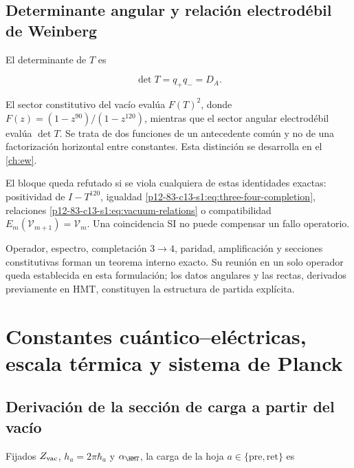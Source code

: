 \subsection{Determinante angular y relaci\'on electrod\'ebil de Weinberg}

El determinante de \(T\) es

\begin{equation}
\det T=q_+q_-=D_A.
\label{p12-83-c13-s1:eq:detT}
\end{equation}

El sector constitutivo del vac\'io eval\'ua \(F(T)^2\), donde
\(F(z)=(1-z^{90})/(1-z^{120})\), mientras que el sector angular
electrod\'ebil eval\'ua \(\det T\). Se trata de dos funciones de un
antecedente com\'un y no de una factorizaci\'on horizontal entre constantes.
Esta distinci\'on se desarrolla en el \cref{ch:ew}.

\begin{falsifier}
El bloque queda refutado si se viola cualquiera de estas identidades exactas:
positividad de \(I-T^{120}\), igualdad
\cref{p12-83-c13-s1:eq:three-four-completion}, relaciones \cref{p12-83-c13-s1:eq:vacuum-relations} o
compatibilidad \(E_m(\mathcal V_{m+1})=\mathcal V_m\). Una coincidencia SI
no puede compensar un fallo operatorio.
\end{falsifier}

\begin{statusbox}
Operador, espectro, completaci\'on \(3\to4\), paridad, amplificaci\'on y
secciones constitutivas forman un teorema interno exacto. Su reuni\'on en un
solo operador queda establecida en esta formulaci\'on; los datos angulares y
las rectas, derivados previamente en HMT, constituyen la estructura de partida
expl\'icita.
\end{statusbox}


\section{Constantes cu\'antico--el\'ectricas, escala t\'ermica y sistema de Planck}
\label{p12-83-c13-s2:ch:metrology}

\subsection{Derivaci\'on de la secci\'on de carga a partir del vac\'io}

Fijados \(Z_{\rm vac}\), \(h_a=2\pi\hbar_a\) y \(\alpha_{\HMT}\), la carga de la hoja \(a\in\{\mathrm{pre},\mathrm{ret}\}\) es

